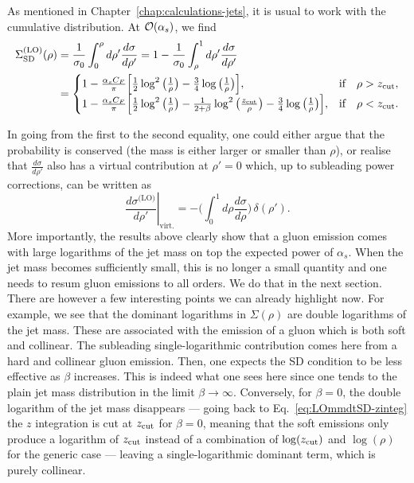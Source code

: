 As mentioned in Chapter~\ref{chap:calculations-jets}, it is usual to
work with the cumulative distribution. At ${\cal O}(\alpha_s)$, we
find
%
\begin{align}
  \Sigma_{\text{SD}}^{\text{(LO)}}(\rho)
  & = \frac{1}{\sigma_0}\int_0^\rho d\rho' \frac{d\sigma}{d\rho'}
  = 1-\frac{1}{\sigma_0}\int_\rho^1 d\rho' \frac{d\sigma}{d\rho'}  \label{eq:mmdtsd-lo-cumul} \\
  & =
  \begin{cases}
     1- \frac{\alpha_sC_F}{\pi}
    \Big[\frac{1}{2}\log^2\big(\frac{1}{\rho}\big)-\frac{3}{4}\log\big(\frac{1}{\rho}\big)\Big], &
  \text{if} \quad \rho>z_{\text{cut}}, \\
    1- \frac{\alpha_sC_F}{\pi}
    \Big[\frac{1}{2}\log^2\big(\frac{1}{\rho}\big)-\frac{1}{2+\beta}\log^2\big(\frac{z_{\text{cut}}}{\rho}\big)-\frac{3}{4}\log\big(\frac{1}{\rho}\big)\Big], &
  \text{if} \quad \rho<z_{\text{cut}}.
  \end{cases}\nonumber
\end{align}

In going from the first to the second equality, one could either argue that
the probability is conserved (\ie the mass is either larger or
smaller than $\rho$), or realise that $\frac{d\sigma}{d\rho'}$ also
has a virtual contribution at $\rho'=0$ which, up to subleading power
corrections, can be written as
\[
  \left. \frac{d\sigma^{\text{(LO)}}}{d\rho'}\right|_{\text{virt.}}
   = -\bigg(\int_0^1 d\rho \frac{d\sigma}{d\rho}\bigg)\,\delta(\rho').
\]
More importantly, the results above clearly show that a gluon emission
comes with large logarithms of the jet mass on top the expected power
of $\alpha_s$. When the jet mass becomes sufficiently small, this is
no longer a small quantity and one needs to resum gluon emissions to
all orders. We do that in the next section.
%
There are however a few interesting points we can already highlight now.
%
For example, we see that the dominant logarithms in $\Sigma(\rho)$ are
double logarithms of the jet mass. These are associated with the
emission of a gluon which is both soft and collinear. The subleading
single-logarithmic contribution comes here from a hard and collinear
gluon emission.
%
Then, one expects the SD condition to be less effective as
$\beta$ increases. This is indeed what one sees here since one tends
to the plain jet mass distribution in the limit
$\beta\to\infty$. Conversely, for $\beta= 0$, the double logarithm of
the jet mass disappears --- going back to
Eq.~\eqref{eq:LOmmdtSD-zinteg} the $z$ integration is cut at $z_{\text{cut}}$
for $\beta=0$, meaning that the soft emissions only produce a
logarithm of $z_{\text{cut}}$ instead of a combination of $\log(z_{\text{cut}})$ and
$\log(\rho)$ for the generic case --- leaving a single-logarithmic
dominant term, which is purely collinear.  

